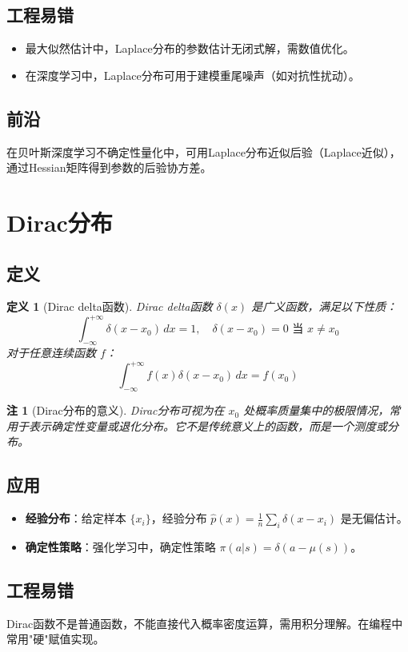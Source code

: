 \documentclass[UTF8, 10pt]{ctexart}
\newtheorem{definition}{定义}[section]
\newtheorem{remark}{注}[section]
\begin{document}
\subsection{工程易错}
\begin{itemize}
    \item 最大似然估计中，Laplace分布的参数估计无闭式解，需数值优化。
    \item 在深度学习中，Laplace分布可用于建模重尾噪声（如对抗性扰动）。
\end{itemize}

\subsection{前沿}
在贝叶斯深度学习不确定性量化中，可用Laplace分布近似后验（Laplace近似），通过Hessian矩阵得到参数的后验协方差。

\section{Dirac分布}
\subsection{定义}
\begin{definition}[Dirac delta函数]
Dirac delta函数 $\delta(x)$ 是广义函数，满足以下性质：
\[
\int_{-\infty}^{+\infty} \delta(x - x_0)\, dx = 1, \quad \delta(x - x_0) = 0 \text{ 当 } x \neq x_0
\]
对于任意连续函数 $f$：
\[
\int_{-\infty}^{+\infty} f(x) \delta(x - x_0)\, dx = f(x_0)
\]
\end{definition}

\begin{remark}[Dirac分布的意义]
Dirac分布可视为在 $x_0$ 处概率质量集中的极限情况，常用于表示确定性变量或退化分布。它不是传统意义上的函数，而是一个测度或分布。
\end{remark}

\subsection{应用}
\begin{itemize}
    \item \textbf{经验分布}：给定样本 $\{x_i\}$，经验分布 $\hat{p}(x) = \frac{1}{n}\sum_i \delta(x-x_i)$ 是无偏估计。
    \item \textbf{确定性策略}：强化学习中，确定性策略 $\pi(a|s) = \delta(a - \mu(s))$。
\end{itemize}

\subsection{工程易错}
Dirac函数不是普通函数，不能直接代入概率密度运算，需用积分理解。在编程中常用"硬"赋值实现。
\end{document}
